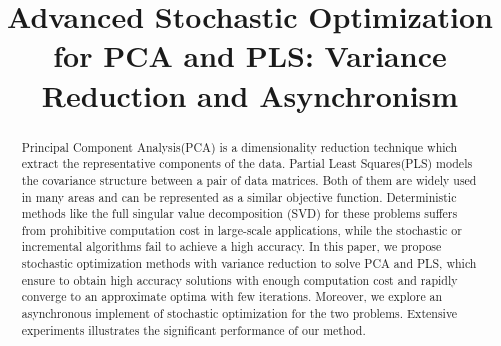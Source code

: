 \documentclass[conference]{IEEEtran}
\begin{document}
%
\title{Advanced Stochastic Optimization for PCA and PLS: Variance Reduction and Asynchronism}




\balance


\maketitle


\begin{abstract}
Principal Component Analysis(PCA) is a dimensionality reduction technique which extract the representative components of the data. Partial Least Squares(PLS) models the covariance structure between a pair of data matrices. Both of them are widely used in many areas and can be represented as a similar objective function. Deterministic methods like the full singular value decomposition (SVD) for these problems suffers from prohibitive computation cost in large-scale applications, while the stochastic or incremental algorithms fail to achieve a high accuracy. In this paper, we propose stochastic optimization methods with variance reduction to solve PCA and PLS, which ensure to obtain high accuracy solutions with enough computation cost and rapidly converge to an approximate optima with  few iterations. Moreover, we explore an asynchronous implement of stochastic optimization for the two problems. Extensive experiments illustrates the significant performance of our method.


\end{abstract}


\IEEEpeerreviewmaketitle
\end{document}
